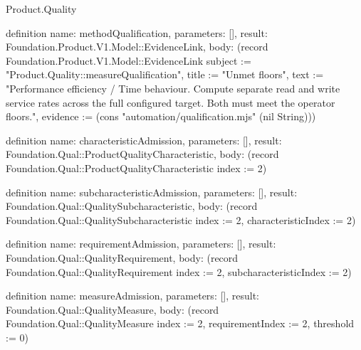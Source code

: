 \begin{lexlean}{Product.Quality}
\begin{semanticmodule}
definition{
  name: methodQualification, parameters: [], result: Foundation.Product.V1.Model::EvidenceLink,
  body: (record Foundation.Product.V1.Model::EvidenceLink {subject := "Product.Quality::measureQualification", title := "Unmet floors", text := "Performance efficiency / Time behaviour. Compute separate read and write service rates across the full configured target. Both must meet the operator floors.", evidence := (cons "automation/qualification.mjs" (nil String))})
}

definition{
  name: characteristicAdmission, parameters: [], result: Foundation.Qual::ProductQualityCharacteristic,
  body: (record Foundation.Qual::ProductQualityCharacteristic {index := 2})
}

definition{
  name: subcharacteristicAdmission, parameters: [], result: Foundation.Qual::QualitySubcharacteristic,
  body: (record Foundation.Qual::QualitySubcharacteristic {index := 2, characteristicIndex := 2})
}

definition{
  name: requirementAdmission, parameters: [], result: Foundation.Qual::QualityRequirement,
  body: (record Foundation.Qual::QualityRequirement {index := 2, subcharacteristicIndex := 2})
}

definition{
  name: measureAdmission, parameters: [], result: Foundation.Qual::QualityMeasure,
  body: (record Foundation.Qual::QualityMeasure {index := 2, requirementIndex := 2, threshold := 0})
}


\end{semanticmodule}
\end{lexlean}
